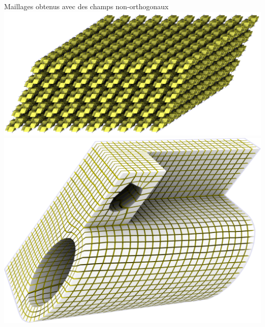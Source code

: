 \iffalse
\begin{frame}{Maillages obtenus avec des champs non-orthogonaux}
    \includegraphics[width=.49\textwidth]{img_spm_ff/parallel.png}
    \includegraphics[width=.49\textwidth]{img_spm_ff/joint_northo.png}
\end{frame}

